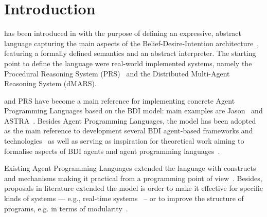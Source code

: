 \section{Introduction}
\label{sec:intro}


%
%
{\asl} has been introduced in \cite{Rao96}  with the purpose of defining an expressive, 
abstract language capturing the main aspects of the Belief-Desire-Intention architecture~\cite{Bratman88,Georgeff:1987:RRP:1863766.1863818}, featuring a formally defined semantics and an abstract interpreter.
%
The starting point to define the language were real-world implemented systems, namely the
Procedural Reasoning System (PRS)~\cite{Ingrand:1992:ARR:629535.629890} and the Distributed Multi-Agent Reasoning System (dMARS).
%

%
% 
{\asl}  and PRS have become a main reference for implementing concrete Agent Programming Languages 
based on the BDI model: 
%
main examples are Jason~\cite{jason06,bordini:07} and ASTRA~\cite{DBLP:conf/prima/CollierRL15}.
%
Besides Agent Programming Languages,  the {\asl}  model has been
adopted as the main reference to development several BDI agent-based
frameworks and technologies~\cite{BordiniMAPlpa,BordiniMAPlta} as well
as serving as inspiration for theoretical work aiming to formalise
aspects of BDI agents and agent programming
languages~\cite{SardinaThangCAN,LouiseAIL,BordiniMCAPL}.


%
%
Existing Agent Programming Languages extended the language with
constructs and mechanisms making it practical from a programming point
of view~\cite{jason06}.
%
Besides, proposals in literature extended the model is order to make
it effective for specific kinds of systems --- e.g., real-time
systems~\cite{Vikhorev:2011:APP:2030470.2030529} -- or to
improve the structure of programs, e.g. in terms of
modularity~\cite{Madden2010,Nunes2014}.

